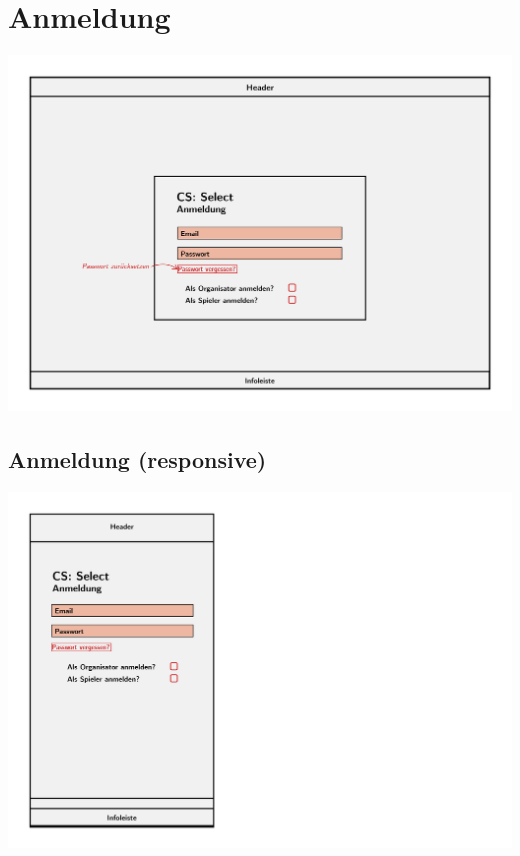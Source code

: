 \documentclass[a4paper]{scrreprt}
\begin{document}
    \section{Anmeldung}
    \centering
    \includegraphics[width=\textwidth]{../pictures/Anmeldung.jpg}
    \subsection{Anmeldung (responsive)}
    \centering
    \includegraphics[width=\textwidth]{../pictures/Anmeldung_responsive.jpg}\\
\end{document}
